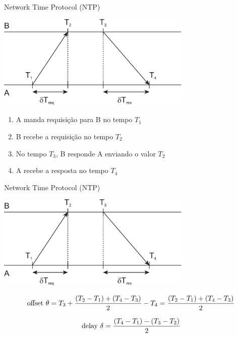 \documentclass[compress]{beamer}
\begin{document}
\begin{frame}{Network Time Protocol (NTP)}

\centering \includegraphics[width=0.7\textwidth]{images/ntp.png}

\begin{enumerate}
    \item A manda requisição para B no tempo $T_1$
    \item B recebe a requisição no tempo $T_2$
    \item No tempo $T_3$, B responde A enviando o valor $T_2$
    \item A recebe a resposta no tempo $T_4$
\end{enumerate}
\end{frame}


\begin{frame}{Network Time Protocol (NTP)}

\centering \includegraphics[width=0.7\textwidth]{images/ntp.png}

$$
\textnormal{offset } \theta = T_3 + \frac{(T_2 - T_1) + (T_4 - T_3)}{2} - T_4 = \frac{(T_2 - T_1) + (T_4 - T_3)}{2}
$$

$$
\textnormal{delay } \delta = \frac{(T_4 - T_1) - (T_3 - T_2)}{2}
$$
\end{frame}

\end{document}
